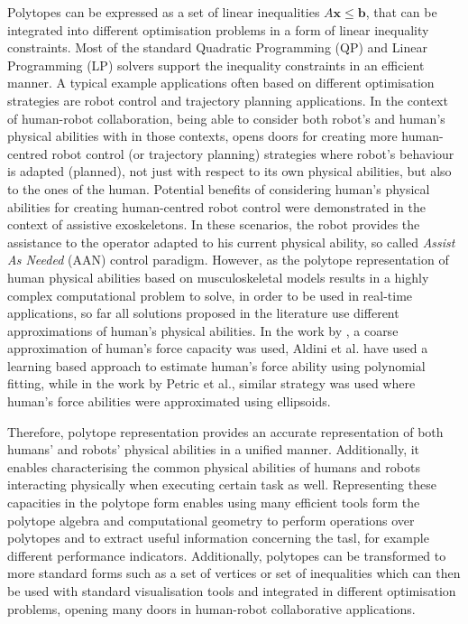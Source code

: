 Polytopes can be expressed as a set of linear inequalities $A\bm{x}\leq\bm{b}$, that can be integrated into different optimisation problems in a form of linear inequality constraints. Most of the standard Quadratic Programming (QP) \cite{boggs_tolle_1995} and Linear Programming (LP) \cite{GOLDFARB198973} solvers support the inequality constraints in an efficient manner. A typical example applications often based on different optimisation strategies are robot control and trajectory planning applications. In the context of human-robot collaboration, being able to consider both robot's and human's physical abilities with in those contexts, opens doors for creating more human-centred robot control (or trajectory planning) strategies where robot's behaviour is adapted (planned), not just with respect to its own physical abilities, but also to the ones of the human.
Potential benefits of considering human's physical abilities for creating human-centred robot control were demonstrated in the context of assistive exoskeletons. In these scenarios, the robot provides the assistance to the operator adapted to his current physical ability, so called \textit{Assist As Needed} (AAN)\cite{carmichael2013admittance} control paradigm.
However, as the polytope representation of human physical abilities based on musculoskeletal models results in a highly complex computational problem to solve, in order to be used in real-time applications, so far all solutions proposed in the literature use different approximations of human's physical abilities. In the work by \citet{carmichael_towards_2011}, a coarse approximation of human's force capacity was used, Aldini et al.\cite{Aldini2021RealTime} have used a learning based approach to estimate human's force ability using polynomial fitting, while in the work by Petric et al.\cite{petric2019assistive}, similar strategy was used where human's force abilities were approximated using ellipsoids.

Therefore, polytope representation provides an accurate representation of both humans' and robots' physical abilities in a unified manner. Additionally, it enables characterising the common physical abilities of humans and robots interacting physically when executing certain task as well. Representing these capacities in the polytope form enables using many efficient tools form the polytope algebra and computational geometry to perform operations over polytopes and to extract useful information concerning the tasl, for example different performance indicators. Additionally, polytopes can be transformed to more standard forms such as a set of vertices or set of inequalities which can then be used with standard visualisation tools and integrated in different optimisation problems, opening many doors in human-robot collaborative applications.

